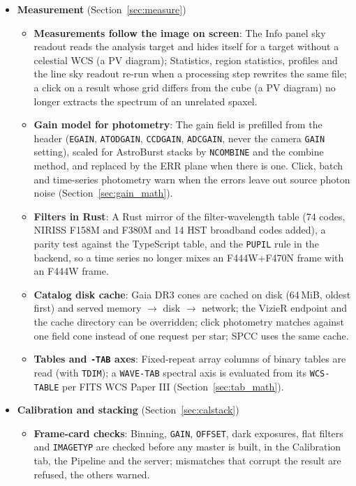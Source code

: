 \documentclass[11pt,a4paper]{article}
\newcommand{\code}[1]{\texttt{\small #1}}
\begin{document}
\begin{itemize}[nosep]
\begin{itemize}[nosep]
        \end{itemize}
    \item \textbf{Measurement} (Section~\ref{sec:measure})
        \begin{itemize}[nosep]
        \item \textbf{Measurements follow the image on screen}: The Info panel sky readout reads the analysis target and hides itself for a target without a celestial WCS (a PV diagram); Statistics, region statistics, profiles and the line sky readout re-run when a processing step rewrites the same file; a click on a result whose grid differs from the cube (a PV diagram) no longer extracts the spectrum of an unrelated spaxel.
        \item \textbf{Gain model for photometry}: The gain field is prefilled from the header (\code{EGAIN}, \code{ATODGAIN}, \code{CCDGAIN}, \code{ADCGAIN}, never the camera \code{GAIN} setting), scaled for AstroBurst stacks by \code{NCOMBINE} and the combine method, and replaced by the ERR plane when there is one. Click, batch and time-series photometry warn when the errors leave out source photon noise (Section~\ref{sec:gain_math}).
        \item \textbf{Filters in Rust}: A Rust mirror of the filter-wavelength table (74 codes, NIRISS F158M and F380M and 14 HST broadband codes added), a parity test against the TypeScript table, and the \code{PUPIL} rule in the backend, so a time series no longer mixes an F444W+F470N frame with an F444W frame.
        \item \textbf{Catalog disk cache}: Gaia DR3 cones are cached on disk (64\,MiB, oldest first) and served memory $\to$ disk $\to$ network; the VizieR endpoint and the cache directory can be overridden; click photometry matches against one field cone instead of one request per star; SPCC uses the same cache.
        \item \textbf{Tables and \code{-TAB} axes}: Fixed-repeat array columns of binary tables are read (with \code{TDIM}); a \code{WAVE-TAB} spectral axis is evaluated from its \code{WCS-TABLE} per FITS WCS Paper III (Section~\ref{sec:tab_math}).
        \end{itemize}
    \item \textbf{Calibration and stacking} (Section~\ref{sec:calstack})
        \begin{itemize}[nosep]
        \item \textbf{Frame-card checks}: Binning, \code{GAIN}, \code{OFFSET}, dark exposures, flat filters and \code{IMAGETYP} are checked before any master is built, in the Calibration tab, the Pipeline and the server; mismatches that corrupt the result are refused, the others warned.

\end{itemize}
\end{itemize}
\end{document}
